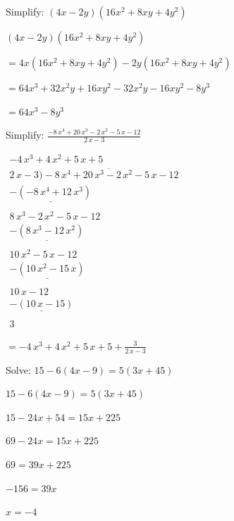 \documentclass[addpoints,12pt,answers]{exam}
\begin{document}
\begin{questions}
\question[5] Simplify: $(4x - 2y)(16x^2 + 8xy + 4y^2)$
\begin{solution}
$(4x - 2y)(16x^2 + 8xy + 4y^2)$ 

 $= 4x(16x^2 + 8xy + 4y^2) - 2y(16x^2 + 8xy + 4y^2)$ 

 $= 64x^3 + 32x^2y + 16xy^2 - 32x^2y - 16xy^2 - 8y^3$ 

 $= \boxed{ 64x^3 - 8y^3 }$
\end{solution}
\answerline


\question[5] Simplify: $\displaystyle \frac{ -8 \, x^{4} + 20 \, x^{3} - 2 \, x^{2} - 5 \, x - 12 }{ 2 \, x - 3 }$
\begin{solution}
$\begin{array}{r} -4 \, x^{3} + 4 \, x^{2} + 5 \, x + 5 \\ 2 \, x - 3 \overline{ ) -8 \, x^{4} + 20 \, x^{3} - 2 \, x^{2} - 5 \, x - 12 } \\ \underline{ -( -8 \, x^{4} + 12 \, x^{3} ) } \\\\ 8 \, x^{3} - 2 \, x^{2} - 5 \, x - 12 \\ \underline{ -( 8 \, x^{3} - 12 \, x^{2} ) } \\\\ 10 \, x^{2} - 5 \, x - 12 \\ \underline{ -( 10 \, x^{2} - 15 \, x ) } \\\\ 10 \, x - 12 \\ \underline{ -( 10 \, x - 15 ) } \\\\ 3 \end{array}$ 

 $= \boxed{ -4 \, x^{3} + 4 \, x^{2} + 5 \, x + 5 + \frac{3}{2 \, x - 3} }$
\end{solution}
\answerline

\newpage

\question[5] Solve: $15 - 6(4x - 9) = 5(3x + 45)$
\begin{solution}
$15 - 6(4x - 9) = 5(3x + 45)$ 

 $15 - 24x + 54 = 15x + 225$ 

 $69 - 24x = 15x + 225$ 

 $69 = 39x + 225$ 

 $-156 = 39x$ 

 $\boxed{ x = -4 }$
\end{solution}
\answerline



\end{questions}
\end{document}
